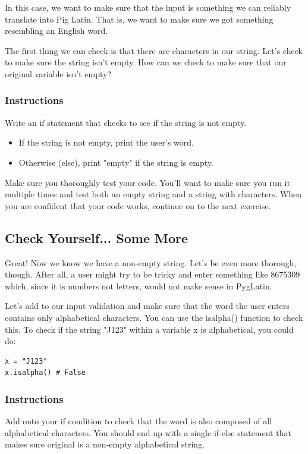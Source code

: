 \documentclass[12pt,a4paper,final,twoside,onecolumn,titlepage]{book}
\begin{document}
In this case, we want to make sure that the input is something we can reliably translate into Pig Latin. That is, we want to make sure we got something resembling an English word.

The first thing we can check is that there are characters in our string. Let's check to make sure the string isn't empty. How can we check to make sure that our original variable isn't empty?
\subsubsection{Instructions}

Write an if statement that checks to see if the string is not empty.
\begin{itemize}
\item    If the string is not empty, print the user's word.
\item    Otherwise (else), print "empty" if the string is empty.
\end{itemize}
Make sure you thoroughly test your code. You'll want to make sure you run it multiple times and test both an empty string and a string with characters. When you are confident that your code works, continue on to the next exercise.

\subsection{Check Yourself... Some More}

Great! Now we know we have a non-empty string. Let's be even more thorough, though. After all, a user might try to be tricky and enter something like 8675309 which, since it is numbers not letters, would not make sense in PygLatin.

Let's add to our input validation and make sure that the word the user enters contains only alphabetical characters. You can use the isalpha() function to check this. To check if the string "J123" within a variable x is alphabetical, you could do:
\begin{lstlisting}
x = "J123"
x.isalpha() # False
\end{lstlisting}

\subsubsection{Instructions}

Add onto your if condition to check that the word is also composed of all alphabetical characters. You should end up with a single if-else statement that makes sure original is a non-empty alphabetical string.
\end{document}
